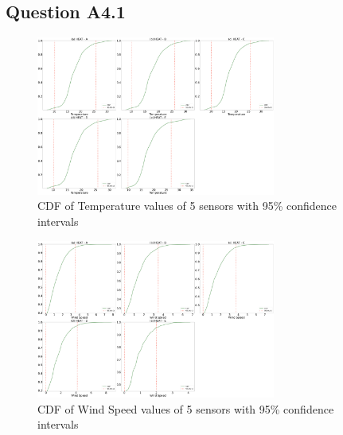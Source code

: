 \documentclass[a4paper]{article}
\begin{document}
\subsection{Question A4.1}
\begin{figure}[htbp]
\centering
\includegraphics[width=0.7\textwidth]{images/CDF_CI_temp.png} 
\caption{CDF of Temperature values of 5 sensors with 95\% confidence intervals}
\end{figure}

\begin{figure}[H]
\centering
\includegraphics[width=0.7\textwidth]{images/CDF_CI_WS.png} 
\caption{CDF of Wind Speed values of 5 sensors with 95\% confidence intervals}
\end{figure}
\end{document}
